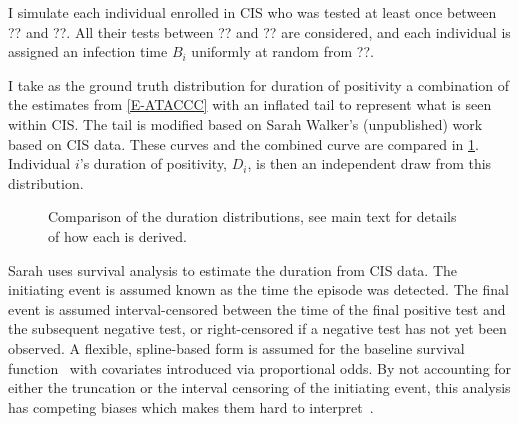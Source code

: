 \documentclass[thesis.tex]{subfiles}
\begin{document}
I simulate each individual enrolled in CIS who was tested at least once between ?? and ??.
All their tests between ?? and ?? are considered, and each individual is assigned an infection time $B_i$ uniformly at random from ??.

I take as the ground truth distribution for duration of positivity a combination of the estimates from \cref{E-ATACCC} with an inflated tail to represent what is seen within CIS.
The tail is modified based on Sarah Walker's (unpublished) work based on CIS data.
These curves and the combined curve are compared in \cref{perf-test:fig:duration-dist}.
Individual $i$'s duration of positivity, $D_i$, is then an independent draw from this distribution.

\begin{figure}
  \caption{Comparison of the duration distributions, see main text for details of how each is derived. \label{perf-test:fig:duration-dist}}
\end{figure}

Sarah uses survival analysis to estimate the duration from CIS data.
The initiating event is assumed known as the time the episode was detected.
The final event is assumed interval-censored between the time of the final positive test and the subsequent negative test, or right-censored if a negative test has not yet been observed.
A flexible, spline-based form is assumed for the baseline survival function~\autocite{roystonSTPM,roystonFlexible} with covariates introduced via proportional odds.
By not accounting for either the truncation or the interval censoring of the initiating event, this analysis has competing biases which makes them hard to interpret~\autocite{cisMethodsONS}.

\end{document}
